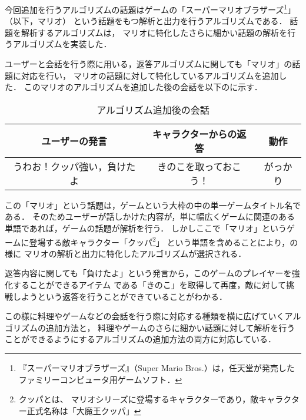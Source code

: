今回追加を行うアルゴリズムの話題はゲームの「スーパーマリオブラザーズ\footnote{『スーパーマリオブラザーズ』（Super Mario Bros.）は，任天堂が発売したファミリーコンピュータ用ゲームソフト．}」（以下，マリオ）
という話題をもつ解析と出力を行うアルゴリズムである．
話題を解析するアルゴリズムは，
マリオに特化したさらに細かい話題の解析を行うアルゴリズムを実装した．

ユーザーと会話を行う際に用いる，返答アルゴリズムに関しても「マリオ」の話題に対応を行い，
マリオの話題に対して特化しているアルゴリズムを追加した．
このマリオのアルゴリズムを追加した後の会話を以下のに示す．

\begin{table}[tbh]
	\caption{アルゴリズム追加後の会話} \label{tab:afterChat}
	\begin{center}
		\begin{tabular}[htb]{c|c|c}
		\hline
		ユーザーの発言 & キャラクターからの返答 & 動作 \\
		\hline
		うわお！クッパ強い，負けたよ & きのこを取っておこう！ & がっかり \\
		\hline
		\end{tabular}
	\end{center}
\end{table}

この「マリオ」という話題は，ゲームという大枠の中の単一ゲームタイトル名である．
そのためユーザーが話しかけた内容が，単に幅広くゲームに関連のある単語であれば，ゲームの話題が解析を行う．
しかしここで「マリオ」というゲームに登場する敵キャラクター「クッパ\footnote{クッパとは、
マリオシリーズに登場するキャラクターであり，敵キャラクター正式名称は「大魔王クッパ」}」
という単語を含めることにより，の様に
マリオの解析と出力に特化したアルゴリズムが選択される．

返答内容に関しても「負けたよ」という発言から，このゲームのプレイヤーを強化することができるアイテム
である「きのこ」を取得して再度，敵に対して挑戦しようという返答を行うことができていることがわかる．

この様に料理やゲームなどの会話を行う際に対応する種類を横に広げていくアルゴリズムの追加方法と，
料理やゲームのさらに細かい話題に対して解析を行うことができるようにするアルゴリズムの追加方法の両方に対応している．

